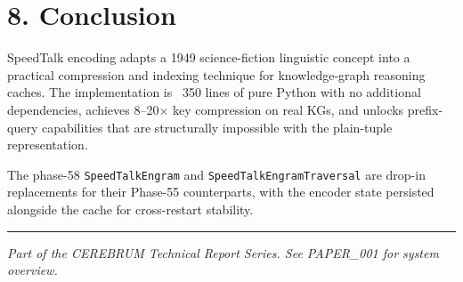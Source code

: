 \section*{8. Conclusion}

SpeedTalk encoding adapts a 1949 science-fiction linguistic concept into a
practical compression and indexing technique for knowledge-graph reasoning caches.
The implementation is ~350 lines of pure Python with no additional dependencies,
achieves 8--20$\times$ key compression on real KGs, and unlocks prefix-query capabilities
that are structurally impossible with the plain-tuple representation.

The phase-58 \texttt{SpeedTalkEngram} and \texttt{SpeedTalkEngramTraversal} are drop-in
replacements for their Phase-55 counterparts, with the encoder state persisted
alongside the cache for cross-restart stability.

\medskip\noindent\rule{\linewidth}{0.4pt}\medskip

\textit{Part of the CEREBRUM Technical Report Series. See PAPER_001 for system overview.}